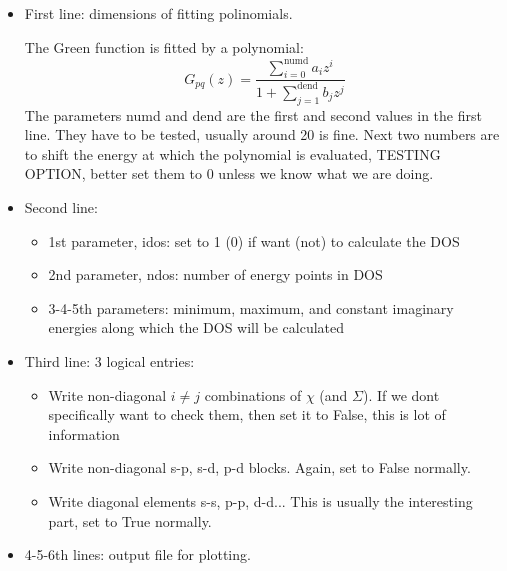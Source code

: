 \documentclass[11pt,fleqn]{book} %
\begin{document}
\begin{itemize}

\item First line: dimensions of fitting polinomials.

The Green function is fitted by a polynomial:
\begin{equation}
G_{pq}(z) = \dfrac{\sum_{i=0}^{\text{numd}}a_{i}z^{i}}
{1+\sum_{j=1}^{\text{dend}}b_{j}z^{j}}
\end{equation}
%
The parameters numd and dend are the first and second values in the first line.
They have to be tested, usually around 20 is fine. Next two numbers are to
shift the energy at which the polynomial is evaluated, TESTING OPTION, better set them
to 0 unless we know what we are doing.

\item Second line:

\begin{itemize}

\item 1st parameter, idos: set to 1 (0) if want (not) to calculate the DOS

\item 2nd parameter, ndos: number of energy points in DOS

\item 3-4-5th parameters: minimum, maximum, and constant imaginary energies along which the
DOS will be calculated

\end{itemize}



\item Third line: 3 logical entries:

\begin{itemize}

\item Write non-diagonal
$i\neq j$ combinations of $\chi$ (and $\Sigma$). If we dont specifically want
to check them, then set it to False, this is lot of information

\item Write non-diagonal s-p, s-d, p-d blocks. Again, set to False normally.

\item Write diagonal elements s-s, p-p, d-d... This is usually the interesting part,
set to True normally.

\end{itemize}

\item 4-5-6th lines: output file for plotting.


\end{itemize}
\end{document}
